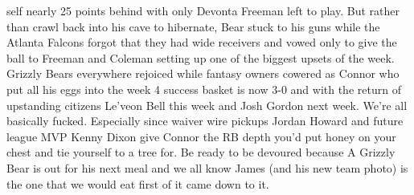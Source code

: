 \documentclass[11pt,letterpaper]{article}
\begin{document}
\par\noindent self nearly 25 points behind with only Devonta Freeman left to play. But rather than crawl back into his cave to hibernate, Bear stuck to his guns while the Atlanta Falcons forgot that they had wide receivers and vowed only to give the ball to Freeman and Coleman setting up one of the biggest upsets of the week. Grizzly Bears everywhere rejoiced while fantasy owners cowered as Connor who put all his eggs into the week 4 success basket is now 3-0 and with the return of upstanding citizens Le'veon Bell this week and Josh Gordon next week. We're all basically fucked. Especially since waiver wire pickups Jordan Howard and future league MVP Kenny Dixon give Connor the RB depth you'd put honey on your chest and tie yourself to a tree for. Be ready to be devoured because A Grizzly Bear is out for his next meal and we all know James (and his new team photo) is the one that we would eat first of it came down to it.
\end{document}
